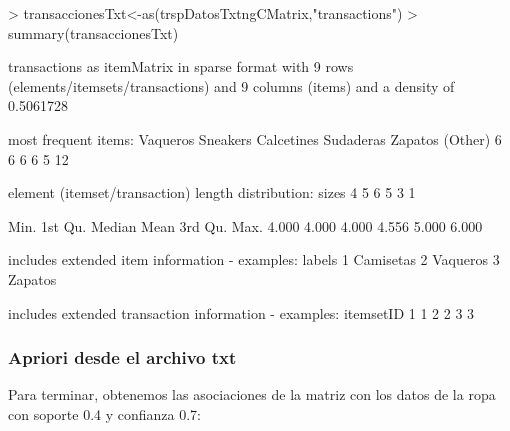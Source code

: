 \documentclass [a4paper] {article}
\begin{document}
\begin{Schunk}
\begin{Sinput}
> transaccionesTxt<-as(trspDatosTxtngCMatrix,"transactions")
> summary(transaccionesTxt)
\end{Sinput}
\begin{Soutput}
transactions as itemMatrix in sparse format with
 9 rows (elements/itemsets/transactions) and
 9 columns (items) and a density of 0.5061728 

most frequent items:
  Vaqueros   Sneakers Calcetines  Sudaderas    Zapatos    (Other) 
         6          6          6          6          5         12 

element (itemset/transaction) length distribution:
sizes
4 5 6 
5 3 1 

   Min. 1st Qu.  Median    Mean 3rd Qu.    Max. 
  4.000   4.000   4.000   4.556   5.000   6.000 

includes extended item information - examples:
     labels
1 Camisetas
2  Vaqueros
3   Zapatos

includes extended transaction information - examples:
  itemsetID
1         1
2         2
3         3
\end{Soutput}
\end{Schunk}


\subsubsection{Apriori desde el archivo txt}
Para terminar, obtenemos las asociaciones de la matriz con los datos de la ropa
con soporte 0.4 y confianza 0.7:
\end{document}
